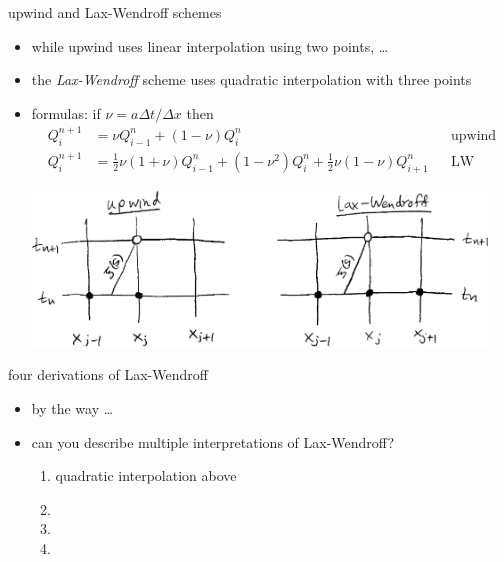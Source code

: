 \documentclass[10pt,dvipsnames,usepdftitle=false,
hyperref={pdftitle = {Finite volume methods},
    pdfauthor = {Ed Bueler}}]{beamer}
\begin{document}
\begin{frame}{upwind and Lax-Wendroff schemes}

\begin{itemize}
\item while upwind uses linear interpolation using two points, \dots
\item the \emph{Lax-Wendroff} scheme uses quadratic interpolation with three points
\item formulas: if $\nu = a\Delta t/\Delta x$ then
\begin{align*}
Q_i^{n+1} &= \nu Q_{i-1}^n + \left(1 - \nu\right) Q_i^n &&\text{upwind} \\
Q_i^{n+1} &= \tfrac{1}{2} \nu (1+\nu) Q_{i-1}^n + \left(1 - \nu^2\right) Q_i^n + \tfrac{1}{2} \nu (1-\nu) Q_{i+1}^n &&\text{LW}
\end{align*}

\begin{center}
\includegraphics[width=0.95\textwidth]{figs/stencilssketch}
\end{center}
\end{itemize}
\end{frame}


\begin{frame}{four derivations of Lax-Wendroff}

\begin{itemize}
\item by the way \dots
\item can you describe multiple interpretations of Lax-Wendroff?
    \begin{enumerate}
    \item<1-4> quadratic interpolation above
    \item<2-4> 
    \item<3-4> 
    \item<4> 
    \end{enumerate}
\end{itemize}
\end{frame}
\end{document}
